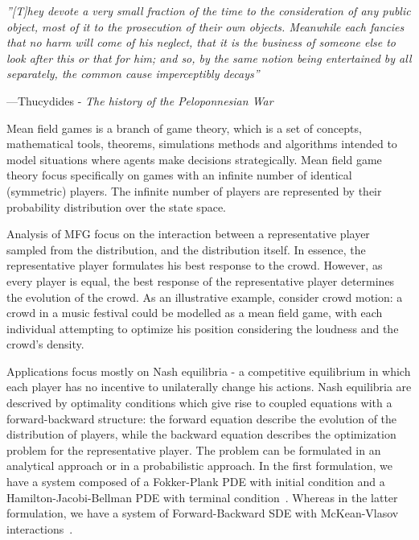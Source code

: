 
 
\epigraph{\itshape ''[T]hey devote a very small fraction of the time to the consideration of any public object, most of it to the prosecution of their own objects. Meanwhile each fancies that no harm will come of his neglect, that it is the business of someone else to look after this or that for him; and so, by the same notion being entertained by all separately, the common cause imperceptibly decays''}{---Thucydides - \textit{The history of the Peloponnesian War}}
 

Mean field games is a branch of game theory,
which is a set of concepts, mathematical tools,
theorems, simulations methods and algorithms intended
to model situations where agents make decisions strategically.
Mean field game theory focus specifically on games with an infinite
number of identical (symmetric) players.
The infinite number of players are represented by their
probability distribution over the state space.

Analysis of MFG focus on the interaction between a representative player sampled
from the distribution, and the distribution itself. In essence, the representative
player formulates his best response to the crowd. However, as every player is
equal, the best response of the representative player determines the evolution
of the crowd.
As an illustrative example, consider crowd motion: a crowd in a music festival 
could be modelled as a mean field game, with each individual attempting to 
optimize his position considering the loudness and the crowd's density. 

Applications focus mostly on Nash equilibria - a competitive equilibrium in which
each player has no incentive to unilaterally change his actions.
Nash equilibria are descrived by optimality conditions which
give rise to coupled equations with a forward-backward structure:
the forward equation describe the evolution of the distribution of players, 
while the backward equation describes the optimization problem for the 
representative player.
The problem can be formulated in an analytical approach or in a probabilistic approach. 
In the first formulation, we have a system composed of a Fokker-Plank PDE
with initial condition and a Hamilton-Jacobi-Bellman PDE with terminal condition~\cite{lasry2007mean}.
Whereas in the latter formulation, we have a system of Forward-Backward SDE
with McKean-Vlasov interactions~\cite{carmona2013mean}. 

\fi
